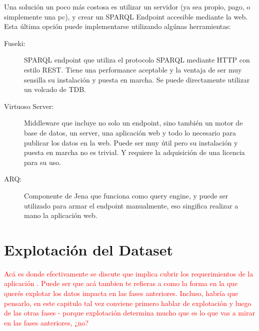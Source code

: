 Una solución un poco más costosa es utilizar un servidor (ya sea propio, pago, o simplemente una pc), y crear un SPARQL Endpoint accesible mediante la web.
Esta última opción puede implementarse utilizando algúnas herramientas:
\begin{description}
\item [Fuseki:] SPARQL endpoint que utiliza el protocolo SPARQL mediante HTTP con estilo REST. Tiene una performance aceptable y la ventaja de ser muy sensilla su instalación y puesta en marcha. Se puede directamente utilizar un volcado de TDB.

\item [Virtuoso Server:] Middleware que incluye no solo un endpoint, sino también un motor de base de datos, un server, una aplicación web y todo lo necesario para publicar los datos en la web. Puede ser muy útil pero su instalación y puesta en marcha no es trivial. Y requiere la adquisición de una licencia para su uso.

\item [ARQ:] Componente de Jena que funciona como query engine, y puede ser utilizado para armar el endpoint manualmente, eso singifica realizar a mano la aplicación web.
\end{description}
\section{Explotación del Dataset}
\label{section:explotacion}
\begin{framed}
\textcolor{red}{Acá es donde efectivamente se discute que implica cubrir los requerimientos de la aplicación . Puede ser que acá tambien te refieras a como la forma en la que querés explotar los datos impacta en las fases anteriores. Incluso, habría que pensarlo, en este capitulo tal vez conviene primero hablar de explotación y luego de las otras fases - porque explotación determina mucho que es lo que vas a mirar en las fases anteriores, ¿no?}
\end{framed}

